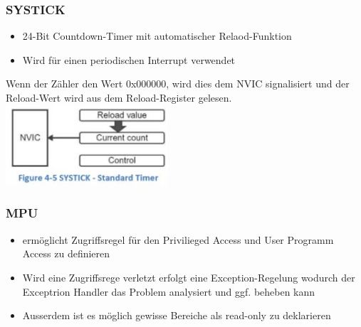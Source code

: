 \begin{multicols}{2}
\begin{minipage}{\linewidth}
    \subsubsection{SYSTICK}
    \begin{itemize}
    \item 24-Bit Countdown-Timer mit automatischer Relaod-Funktion
    \item Wird für einen periodischen Interrupt verwendet
    \end{itemize}
    Wenn der Zähler den Wert 0x000000, wird dies dem NVIC signalisiert und  der Reload-Wert wird aus dem Reload-Register gelesen.
    \includegraphics[width=6cm]{images/NVIC}\\
\end{minipage}
\begin{minipage}{\linewidth}
    \subsubsection{MPU}
    \begin{itemize}
    \item ermöglicht Zugriffsregel für den Privilieged Access und User Programm Access zu definieren
    \item \rightarrow Wird eine Zugriffsrege verletzt erfolgt eine Exception-Regelung wodurch der Exceptrion Handler das Problem analysiert und ggf. beheben kann
    \item \rightarrow Ausserdem ist es möglich gewisse Bereiche als read-only zu deklarieren
    \end{itemize}
\end{minipage}
\end{multicols}
\clearpage


